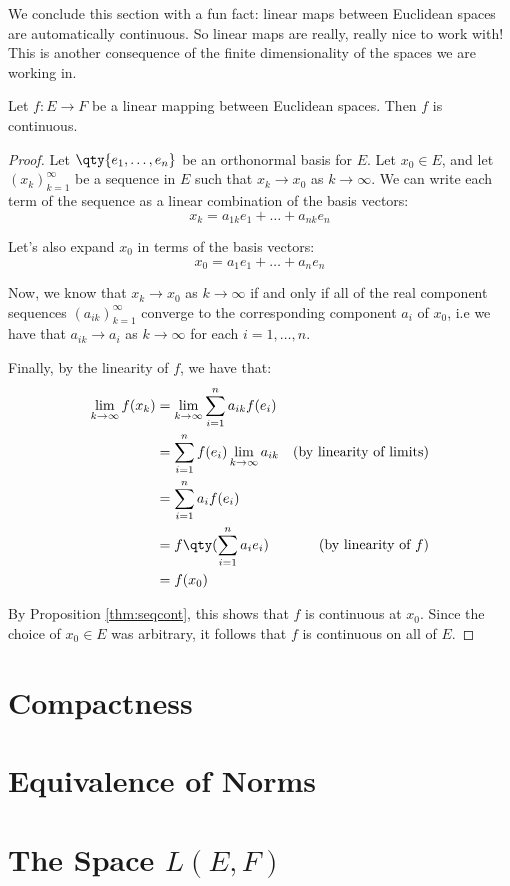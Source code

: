  \vspace{3mm}

 We conclude this section with a fun fact: linear maps between Euclidean spaces are automatically continuous. So linear maps are really, really nice to work with! This is another consequence of the finite dimensionality of the spaces we are working in.

 \begin{theorem}
   Let \( f:E\to F \) be a linear mapping between Euclidean spaces. Then \( f \) is continuous.
 \end{theorem}
 \begin{proof}
   Let \( \qty{e_1,\dots, e_n} \) be an orthonormal basis for \( E \). Let \( x_0\in E \), and let \( (x_k)_{k=1}^\infty \) be a sequence in \( E \) such that \( x_k\to x_0 \) as \( k\to\infty \). We can write each term of the sequence as a linear combination of the basis vectors:
   \[ x_k=a_{1k}e_1+\dots+a_{nk}e_n \]

   Let's also expand \( x_0 \) in terms of the basis vectors:
   \[ x_0=a_1e_1+\dots+a_ne_n \]

   Now, we know that \( x_k\to x_0 \) as \( k\to\infty \) if and only if all of the real component sequences \( (a_{ik})_{k=1}^\infty \) converge to the corresponding component \( a_i \) of \( x_0 \), i.e we have that \( a_{ik}\to a_i \) as \( k\to\infty \) for each \( i=1,\dots,n \).

   \vspace{3mm}

   Finally, by the linearity of \( f \), we have that:
   \begin{align*}
     \lim_{k\to\infty}f(x_k)&= \lim_{k\to\infty}\sum_{i=1}^n a_{ik}f(e_i)\\
     &= \sum_{i=1}^n f(e_i)\lim_{k\to\infty} a_{ik} &(\text{by linearity of limits})\\
     &= \sum_{i=1}^n a_i f(e_i)\\
     &= f\qty(\sum_{i=1}^n a_ie_i) &(\text{by linearity of }f)\\
     &= f(x_0)
   \end{align*}

   By Proposition \ref{thm:seqcont}, this shows that \( f \) is continuous at \( x_0 \). Since the choice of \( x_0\in E \) was arbitrary, it follows that \( f \) is continuous on all of \( E \).
 \end{proof}

\section{Compactness}
\section{Equivalence of Norms}
\section{The Space \( L(E,F) \)}

